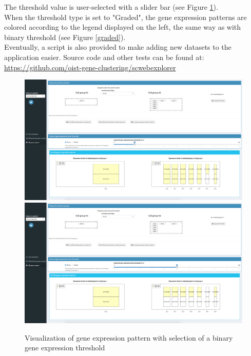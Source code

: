 \documentclass{report}
\begin{document}
{The threshold value is user-selected with a slider bar (see Figure \ref{visualization}).\\

When the threshold type is set to "Graded", the gene expression patterns are colored according to the legend displayed on the left, the same way as with binary threshold (see Figure \ref{graded}).\\

Eventually, a script is also provided to make adding new datasets to the application easier. Source code and other tests can be found at: {\url{https://github.com/oist-gene-clustering/scwebexplorer}}

\begin{figure}[H]
\centering
\subfigure\includegraphics[scale=0.2]{application/patternthres1.png}
\subfigure\includegraphics[scale=0.2]{application/patternthres2.png}
\caption{Visualization of gene expression pattern with selection of a binary gene expression threshold}
\label{visualization}
\end{figure}

}
\end{document}
